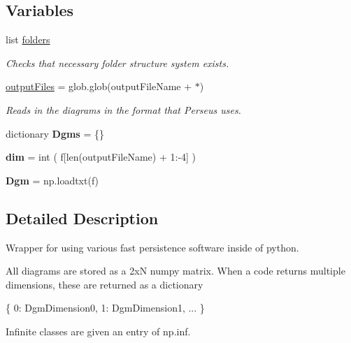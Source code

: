 \subsection*{Variables}
\begin{DoxyCompactItemize}
\item 
list \hyperlink{namespaceteaspoon_1_1_t_d_a_1_1_persistence_a5d89c08933153d3fea60fd71e9e16800}{folders}
\begin{DoxyCompactList}\small\item\em Checks that necessary folder structure system exists. \end{DoxyCompactList}\item 
\hyperlink{namespaceteaspoon_1_1_t_d_a_1_1_persistence_ae41c85513e98b32d96c75124929c4d2c}{output\+Files} = glob.\+glob(output\+File\+Name + \textquotesingle{}$\ast$\textquotesingle{})
\begin{DoxyCompactList}\small\item\em Reads in the diagrams in the format that Perseus uses. \end{DoxyCompactList}\item 
\mbox{\label{namespaceteaspoon_1_1_t_d_a_1_1_persistence_a23124e4420ddc7cc2be201af0d46f384}} 
dictionary {\bfseries Dgms} = \{\}
\item 
\mbox{\label{namespaceteaspoon_1_1_t_d_a_1_1_persistence_a401a006d9a9151a63298278d463f7973}} 
{\bfseries dim} = int ( f\mbox{[}len(output\+File\+Name) + 1\+:-\/4\mbox{]} )
\item 
\mbox{\label{namespaceteaspoon_1_1_t_d_a_1_1_persistence_ad755079d8b56f84312c5e4f23db15f19}} 
{\bfseries Dgm} = np.\+loadtxt(f)
\end{DoxyCompactItemize}


\subsection{Detailed Description}
Wrapper for using various fast persistence software inside of python. 

All diagrams are stored as a 2xN numpy matrix. When a code returns multiple dimensions, these are returned as a dictionary 
\begin{DoxyCode}
\{
    0: DgmDimension0,
    1: DgmDimension1,
    ...
\}
\end{DoxyCode}
 Infinite classes are given an entry of np.\+inf.


